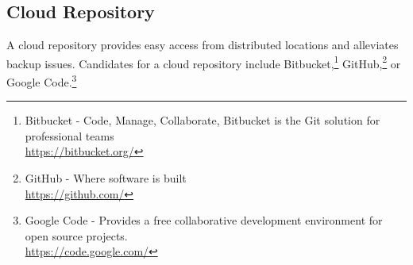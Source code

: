 
\newpage
\subsection{Cloud Repository}
A cloud repository provides easy access from distributed
locations and alleviates backup issues.  Candidates for
a cloud repository include Bitbucket,\footnote{Bitbucket - Code, Manage, Collaborate,
Bitbucket is the Git solution for professional teams\\
\href{https://bitbucket.org/}{https://bitbucket.org/}}
GitHub,\footnote{GitHub - Where software is built\\
\href{https://github.com/}{https://github.com/}}
or Google Code.\footnote{Google Code - Provides a free collaborative development environment
for open source projects.\\
\href{https://code.google.com/}{https://code.google.com/}}


